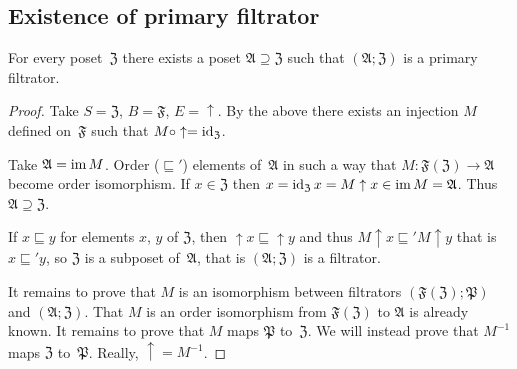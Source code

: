 \subsection{Existence of primary filtrator}
\begin{thm}
For every poset~$\mathfrak{Z}$ there exists a poset $\mathfrak{A}\supseteq\mathfrak{Z}$
such that $(\mathfrak{A};\mathfrak{Z})$ is a primary filtrator.\end{thm}
\begin{proof}
Take $S=\mathfrak{Z}$, $B=\mathfrak{F}$, $E=\uparrow$. By the above
there exists an injection $M$ defined on~$\mathfrak{F}$ such that
$M\circ\uparrow=\operatorname{id}_{\mathfrak{Z}}$.

Take $\mathfrak{A}=\operatorname{im} M$. Order ($\sqsubseteq'$) elements of~$\mathfrak{A}$
in such a way that $M:\mathfrak{F}(\mathfrak{Z})\rightarrow\mathfrak{A}$
become order isomorphism. If $x\in\mathfrak{Z}$ then $x=\operatorname{id}_{\mathfrak{Z}}x=M\uparrow x\in\operatorname{im} M=\mathfrak{A}$.
Thus $\mathfrak{A}\supseteq\mathfrak{Z}$.

If $x\sqsubseteq y$ for elements $x$, $y$ of $\mathfrak{Z}$, then
$\uparrow x\sqsubseteq\uparrow y$ and thus $M\uparrow x\sqsubseteq'M\uparrow y$
that is $x\sqsubseteq'y$, so $\mathfrak{Z}$ is a subposet of~$\mathfrak{A}$,
that is $(\mathfrak{A};\mathfrak{Z})$ is a filtrator.

It remains to prove that $M$ is an isomorphism between filtrators
$(\mathfrak{F}(\mathfrak{Z});\mathfrak{P})$ and $(\mathfrak{A};\mathfrak{Z})$.
That $M$ is an order isomorphism from $\mathfrak{F}(\mathfrak{Z})$
to $\mathfrak{A}$ is already known. It remains to prove that $M$
maps $\mathfrak{P}$ to~$\mathfrak{Z}$. We will instead prove that
$M^{-1}$ maps $\mathfrak{Z}$ to~$\mathfrak{P}$. Really, $\uparrow=M^{-1}$.\end{proof}

